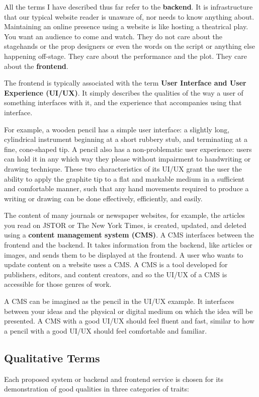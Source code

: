All the terms I have described thus far refer to the \textbf{backend}. It is infrastructure that our typical website reader is unaware of, nor needs to know anything about. Maintaining an online presence using a website is like hosting a theatrical play. You want an audience to come and watch. They do not care about the stagehands or the prop designers or even the words on the script or anything else happening off-stage. They care about the performance and the plot. They care about the \textbf{frontend}.

The frontend is typically associated with the term \textbf{User Interface and User Experience (UI/UX)}. It simply describes the qualities of the way a user of something interfaces with it, and the experience that accompanies using that interface.

For example, a wooden pencil has a simple user interface: a slightly long, cylindrical instrument beginning at a short rubbery stub, and terminating at a fine, cone-shaped tip. A pencil also has a non-problematic user experience: users can hold it in any which way they please without impairment to handwriting or drawing technique. These two characteristics of its UI/UX grant the user the ability to apply the graphite tip to a flat and markable medium in a sufficient and comfortable manner, such that any hand movements required to produce a writing or drawing can be done effectively, efficiently, and easily.

The content of many journals or newspaper websites, for example, the articles you read on JSTOR or The New York Times, is created, updated, and deleted using a \textbf{content management system (CMS)}. A CMS interfaces between the frontend and the backend. It takes information from the backend, like articles or images, and sends them to be displayed at the frontend. A user who wants to update content on a website uses a CMS\@. A CMS is a tool developed for publishers, editors, and content creators, and so the UI/UX of a CMS is accessible for those genres of work.

A CMS can be imagined as the pencil in the UI/UX example. It interfaces between your ideas and the physical or digital medium on which the idea will be presented. A CMS with a good UI/UX should feel fluent and fast, similar to how a pencil with a good UI/UX should feel comfortable and familiar.

\subsection{Qualitative Terms}
Each proposed system or backend and frontend service is chosen for its demonstration of good qualities in three categories of traits:

